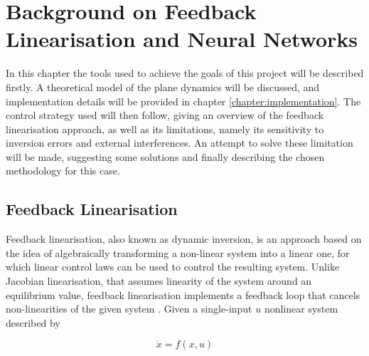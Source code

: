
\chapter{Background on Feedback Linearisation and Neural Networks}
\label{chapter:background}

In this chapter the tools used to achieve the goals of this project will be described firstly. A theoretical model of the plane dynamics will be discussed, and implementation details will be provided in chapter \ref{chapter:implementation}. The control strategy used will then follow, giving an overview of the feedback linearisation approach, as well as its limitations, namely its sensitivity to inversion errors and external interferences. An attempt to solve these limitation will be made, suggesting some solutions and finally describing the chosen methodology for this case.




\section{Feedback Linearisation}
\label{section:background/NLI}

Feedback linearisation, also known as dynamic inversion, is an approach based on the idea of algebraically transforming a non-linear system into a linear one, for which linear control laws can be used to control the resulting system. Unlike Jacobian linearisation, that assumes linearity of the system around an equilibrium value, feedback linearisation implements a feedback loop that cancels non-linearities of the given system \cite{Slotine+Li}. Given a single-input $u$ nonlinear system described by

\begin{equation}
\dot{x} = f(x,u)
\label{eq:nonlinear_system}
\end{equation}

